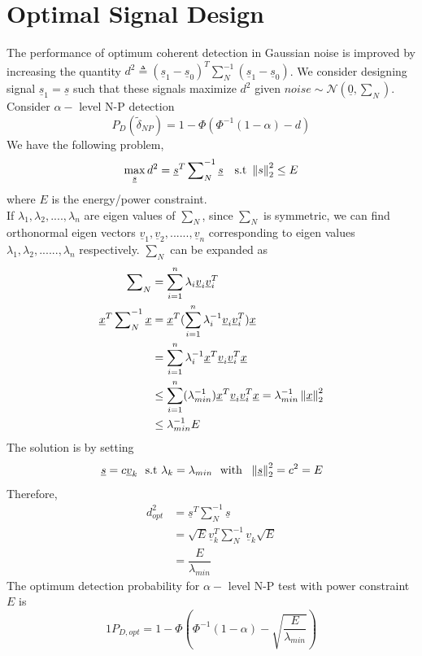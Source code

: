 \documentclass[a4paper,english,12pt]{article}
\begin{document}
\section{Optimal Signal Design}
The performance of optimum coherent detection in Gaussian noise is improved by increasing the quantity $d^2 \triangleq (\underline{s}_1 - \underline{s}_0)^T \sum_N^{-1} (\underline{s}_1 - \underline{s}_0)$. We consider designing signal $\underline{s}_1=\underline{s}$ such that these signals maximize $d^2$ given $noise \sim \mathcal{N}(\underline{0},\sum_N)$.\\
Consider $\alpha-$ level N-P detection 
$$ P_D(\tilde{\delta}_{NP}) = 1-\Phi(\Phi^{-1}(1-\alpha) -d)$$
We have the following problem,
\begin{equation}
\max_{\underline{s}} d^2 = \underline{s}^T \sum\nolimits_N^{-1} \underline{s} \ \ \  \mbox{s.t} \ \left\lVert s\right\rVert^2_2 \leq E
\end{equation}
\noindent where $E$ is the energy/power constraint.\\

\noindent If $\lambda_1, \lambda_2, ....,\lambda_n$ are eigen values of $\sum_N$, since $\sum_N$ is symmetric, we can find orthonormal eigen vectors $\underline{v}_1, \underline{v}_2,......,\underline{v}_n$ corresponding to eigen values $\lambda_1,\lambda_2,......,\lambda_n$ respectively. $\sum_N$ can be expanded as
\begin{align*}
\sum\nolimits_N &=\sum_{i=1}^{n}\lambda_i \underline{v}_i \underline{v}_i^T \\
\underline{x}^T \sum\nolimits_N^{-1} \underline{x} &= \underline{x}^T (\sum_{i=1}^{n} \lambda_i^{-1} \underline{v}_i\underline{v}_i^T)\underline{x} \\
&=\sum_{i=1}^n \lambda_i^{-1} \underline{x}^T \underline{v}_i\underline{v}_i^T \underline{x} \\
&\leq \sum_{i=1}^n (\lambda_{min}^{-1})\underline{x}^T\underline{v}_i\underline{v}_i^T \underline{x}=\lambda_{min}^{-1} \left\lVert\underline{x}\right\rVert^2_2 \nonumber\\
&\leq \lambda_{min}^{-1}E
\end{align*}
\noindent The solution is by setting 
$$\underline{s}=c \underline{v}_k \ \ \mbox{s.t} \ \lambda_k = \lambda_{min} \ \ \mbox{with} \ \ \norm{\underline{s}}^2_2 = c^2=E $$
Therefore,
\begin{align*}
d_{opt}^2 &=\underline{s}^T \sum\nolimits_N^{-1}\underline{s}  \\
&=\sqrt{E} \underline{v}_k^T \sum\nolimits_N^{-1} \underline{v}_k \sqrt{E}\\
&= \dfrac{E}{\lambda_{min}}
\end{align*}
\noindent The optimum detection probability for $\alpha-$ level N-P test with power constraint $E$ is 
\begin{equation}
1P_{D,opt}=1-\Phi\left(\Phi^{-1}(1-\alpha) - \sqrt{\dfrac{E}{\lambda_{min}}}\right)
\end{equation}
\end{document}
